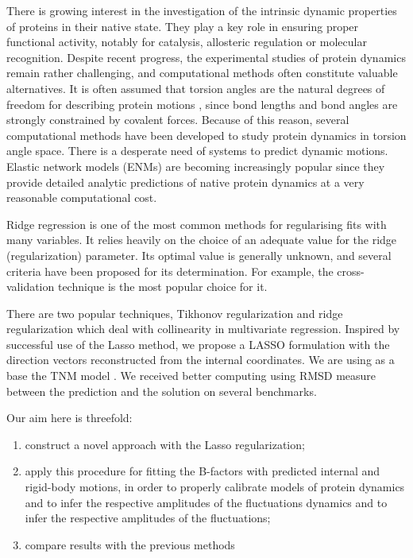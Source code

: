 \documentclass[12pt,twoside]{article}
\begin{document}
        There is growing interest in the investigation of the intrinsic dynamic properties of proteins in their native state. They play a key role in ensuring proper functional activity, notably for catalysis, allosteric regulation or molecular recognition. 
        Despite recent progress, the experimental studies of protein dynamics remain rather challenging, and computational methods often constitute valuable alternatives. 
        It is often assumed that torsion angles are the natural degrees of freedom for describing protein motions \cite{pmid:20867208} ,
since bond lengths and bond angles are strongly constrained by covalent forces. Because of this reason,
several computational methods have been developed to study protein dynamics in torsion angle space. 
There is a desperate need of systems to predict dynamic motions. 
Elastic network models (ENMs) \cite{PhysRevLett.77.1905, ATILGAN2001505, BAHAR2005586} are becoming increasingly popular since they provide detailed analytic predictions of native protein dynamics at a very reasonable computational cost. 

Ridge regression is one of the most common methods for regularising fits with many variables.  It relies heavily on the choice of an adequate value for the ridge (regularization) parameter. Its optimal value is generally unknown, and several criteria have been proposed for its determination. 
For example, the cross-validation technique is the most popular choice for it.

There are two popular techniques, Tikhonov regularization and ridge regularization which deal with collinearity in multivariate regression. 
Inspired by successful use of the Lasso method, we propose a LASSO formulation with the direction vectors reconstructed from the internal coordinates. 
We are using as a base the TNM model \cite{pmid:20867208}.  
We received better  computing using RMSD measure between the prediction and the solution on several benchmarks.
\bigskip
\bigskip

Our aim here is threefold: 
\begin{enumerate}
\item construct a novel approach with the Lasso regularization;
 \item  apply this procedure for fitting the B-factors with predicted internal and rigid-body motions, in order to properly calibrate models of protein dynamics and to infer the respective amplitudes of the fluctuations dynamics and to infer the respective amplitudes of the fluctuations;
  \item  compare results with the previous methods
\end{enumerate}
  
\end{document}
